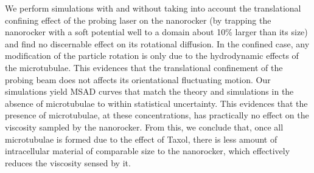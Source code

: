 \documentclass[ twoside,openright,titlepage,numbers=noenddot,%
headinclude,footinclude,cleardoublepage=empty,abstract=on,
BCOR=5mm,paper=a4,fontsize=11pt, dvipsnames
]{scrreprt}
\begin{document}
We perform simulations with and without taking into account the translational confining effect of the probing laser on the nanorocker (by trapping the nanorocker with a soft potential well to a domain about 10\% larger than its size) and find no discernable effect on its rotational diffusion. In the confined case, any modification of the particle rotation is only due to the hydrodynamic effects of the microtubulae. This evidences that the translational confinement of the probing beam does not affects its orientational fluctuating motion.
Our simulations yield MSAD curves that match the theory and simulations in the absence of microtubulae to within statistical uncertainty. This evidences that the presence of microtubulae, at these concentrations, has practically no effect on the viscosity sampled by the nanorocker. From this, we conclude that, once all microtubulae is formed due to the effect of Taxol, there is less amount of intracellular material of comparable size to the nanorocker, which effectively reduces the viscosity sensed by it.

%
\end{document}
